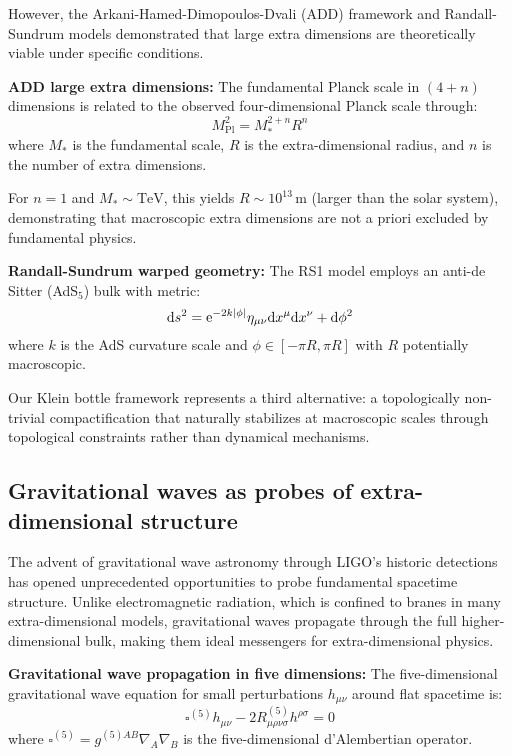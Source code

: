 \documentclass[12pt]{iopart}
\begin{document}
However, the Arkani-Hamed-Dimopoulos-Dvali (ADD) framework \cite{ArkaniHamed1998} and Randall-Sundrum models \cite{Randall1999} demonstrated that large extra dimensions are theoretically viable under specific conditions.

\textbf{ADD large extra dimensions:}
The fundamental Planck scale in $(4+n)$ dimensions is related to the observed four-dimensional Planck scale through:
\begin{equation}
M_{\mathrm{Pl}}^2 = M_*^{2+n} R^n
\label{eq:add_relation}
\end{equation}
where $M_*$ is the fundamental scale, $R$ is the extra-dimensional radius, and $n$ is the number of extra dimensions.

For $n = 1$ and $M_* \sim \mathrm{TeV}$, this yields $R \sim 10^{13}\,\mathrm{m}$ (larger than the solar system), demonstrating that macroscopic extra dimensions are not a priori excluded by fundamental physics.

\textbf{Randall-Sundrum warped geometry:}
The RS1 model employs an anti-de Sitter (AdS$_5$) bulk with metric:
\begin{equation}
{\rm d}s^2 = {\rm e}^{-2k|\phi|}\eta_{\mu\nu} {\rm d}x^\mu {\rm d}x^\nu + {\rm d}\phi^2
\label{eq:rs_metric}
\end{equation}
where $k$ is the AdS curvature scale and $\phi \in [-\pi R, \pi R]$ with $R$ potentially macroscopic.

Our Klein bottle framework represents a third alternative: a topologically non-trivial compactification that naturally stabilizes at macroscopic scales through topological constraints rather than dynamical mechanisms.

\subsection{Gravitational waves as probes of extra-dimensional structure}

The advent of gravitational wave astronomy through LIGO's historic detections \cite{Abbott2016observation,Abbott2021gwtc3} has opened unprecedented opportunities to probe fundamental spacetime structure. Unlike electromagnetic radiation, which is confined to branes in many extra-dimensional models, gravitational waves propagate through the full higher-dimensional bulk, making them ideal messengers for extra-dimensional physics.

\textbf{Gravitational wave propagation in five dimensions:}
The five-dimensional gravitational wave equation for small perturbations $h_{\mu\nu}$ around flat spacetime is:
\begin{equation}
\square^{(5)} h_{\mu\nu} - 2R^{(5)}_{\mu\rho\nu\sigma} h^{\rho\sigma} = 0
\label{eq:5d_wave_equation}
\end{equation}
where $\square^{(5)} = g^{(5)AB} \nabla_A \nabla_B$ is the five-dimensional d'Alembertian operator.
\end{document}
